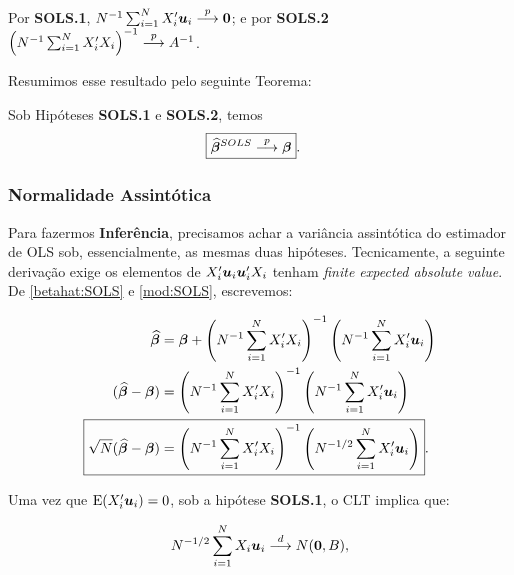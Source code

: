 \documentclass[11pt, oneside, a4paper, article]{article}
\numberwithin{equation}{section}
\begin{document}
Por \textbf{SOLS.1},
$N^{-1} \sum_{i=1}^{N} X_{i}' \boldsymbol{u}_{i}  \overset{p}{\longrightarrow}  \boldsymbol{0}$;
e por \textbf{SOLS.2}
$\left( N^{-1} \sum_{i=1}^{N} X_{i}' X_{i} \right)^{-1}  \overset{p}{\longrightarrow}  A^{-1}$.

Resumimos esse resultado pelo seguinte Teorema:

\begin{teo1}\label{SOLS:const}
Sob Hipóteses \textbf{SOLS.1} e \textbf{SOLS.2}, temos 
\begin{align*}
\Aboxed{
	\betahatbold^{SOLS} \arrowp \betavec
}.
\end{align*}
\end{teo1}

\subsubsection{Normalidade Assintótica}

Para fazermos \textbf{Inferência}, precisamos achar a variância assintótica do estimador de OLS sob, essencialmente, as mesmas duas hipóteses. 
Tecnicamente, a seguinte derivação exige os elementos de
$X_{i}' \boldsymbol{u}_{i} \boldsymbol{u}_{i}' X_{i}$
tenham \textit{finite expected absolute value}.
De \eqref{betahat:SOLS} e \eqref{mod:SOLS}, escrevemos:

\vspace{-1 em}
\begin{align*} 
\betahatbold  &=
\betavec +
\left( N^{-1} \sum_{i=1}^{N} X_{i}' X_{i}   \right)^{-1}
\left( N^{-1} \sum_{i=1}^{N} X_{i}' \mbs{u}_{i}   \right)
\\ 
(\betahatbold - \betavec) &= 
\left( N^{-1} \sum_{i=1}^{N} X_{i}' X_{i}   \right)^{-1}
\left( N^{-1} \sum_{i=1}^{N} X_{i}' \mbs{u}_{i}   \right)
\\ 
\Aboxed{
\sqrt{N}(\betahatbold - \betavec) &= 
\left( N^{-1} \sum_{i=1}^{N} X_{i}' X_{i}   \right)^{-1}
\left( N^{-1/2} \sum_{i=1}^{N} X_{i}' \mbs{u}_{i}   \right)
}.
\end{align*}

Uma vez que $\text{E}(X_{i}' \boldsymbol{u}_{i})=0$, sob a hipótese \textbf{SOLS.1}, o CLT implica que:

\vspace{-1 em}
\begin{align*} 
N^{-1/2} \sum_{i=1}^{N} X_{i} \boldsymbol{u}_{i}  \overset{d}{\longrightarrow}  N(\boldsymbol{0}, B),
\end{align*}
\end{document}
